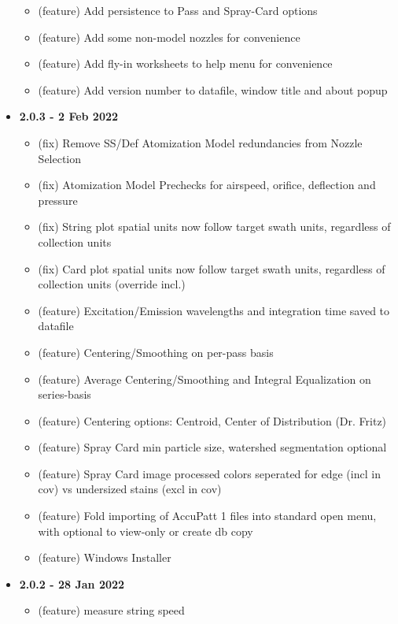 \documentclass[10pt,letterpaper,titlepage]{article}
\begin{document}
\begin{itemize}
\begin{itemize}
            \item (feature) Add persistence to Pass and Spray-Card options
            \item (feature) Add some non-model nozzles for convenience
            \item (feature) Add fly-in worksheets to help menu for convenience
            \item (feature) Add version number to datafile, window title and about popup
        \end{itemize}
        \item \textbf{2.0.3 - 2 Feb 2022}
        \begin{itemize}
            \item (fix) Remove SS/Def Atomization Model redundancies from Nozzle Selection
            \item (fix) Atomization Model Prechecks for airspeed, orifice, deflection and pressure
            \item (fix) String plot spatial units now follow target swath units, regardless of collection units
            \item (fix) Card plot spatial units now follow target swath units, regardless of collection units (override incl.)
            \item (feature) Excitation/Emission wavelengths and integration time saved to datafile
            \item (feature) Centering/Smoothing on per-pass basis
            \item (feature) Average Centering/Smoothing and Integral Equalization on series-basis
            \item (feature) Centering options: Centroid, Center of Distribution (Dr. Fritz)
            \item (feature) Spray Card min particle size, watershed segmentation optional
            \item (feature) Spray Card image processed colors seperated for edge (incl in cov) vs undersized stains (excl in cov)
            \item (feature) Fold importing of AccuPatt 1 files into standard open menu, with optional to view-only or create db copy
            \item (feature) Windows Installer
        \end{itemize}
        \item \textbf{2.0.2 - 28 Jan 2022}
        \begin{itemize}
            \item (feature) measure string speed

\end{itemize}
\end{itemize}
\end{document}
